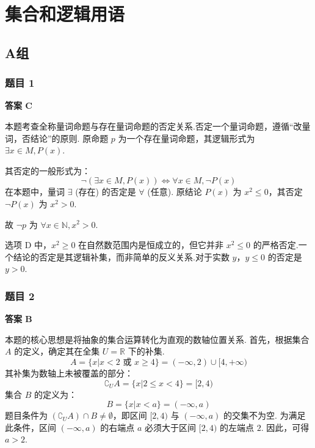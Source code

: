 \section{集合和逻辑用语}

\subsection*{A组}

\subsubsection*{题目 1}
\begin{solution}
	\textbf{答案 C}
	
	本题考查全称量词命题与存在量词命题的否定关系.否定一个量词命题，遵循“改量词，否结论”的原则.
	原命题 $p$ 为一个存在量词命题，其逻辑形式为 $\exists x \in M, P(x)$.
	
	其否定的一般形式为：
	\[ \neg (\exists x \in M, P(x)) \iff \forall x \in M, \neg P(x) \]
	在本题中，量词 $\exists$ (存在) 的否定是 $\forall$ (任意).
	原结论 $P(x)$ 为 $x^2 \le 0$，其否定 $\neg P(x)$ 为 $x^2 > 0$.
	
	故 $\neg p$ 为 $\forall x \in \mathbb{N}, x^2 > 0$.
\end{solution}

\begin{note}
	选项 D 中，$x^2 \ge 0$ 在自然数范围内是恒成立的，但它并非 $x^2 \le 0$ 的严格否定.一个结论的否定是其逻辑补集，而非简单的反义关系.对于实数 $y$，$y \le 0$ 的否定是 $y>0$.
\end{note}

\subsubsection*{题目 2}
\begin{solution}
	\textbf{答案 B}
	
	本题的核心思想是将抽象的集合运算转化为直观的数轴位置关系.
	首先，根据集合 $A$ 的定义，确定其在全集 $U=\mathbb{R}$ 下的补集.
	\[ A = \{x|x<2 \text{ 或 } x \ge 4\} = (-\infty, 2) \cup [4, +\infty) \]
	其补集为数轴上未被覆盖的部分：
	\[ \complement_U A = \{x|2 \le x < 4\} = [2, 4) \]
	集合 $B$ 的定义为：
	\[ B = \{x|x<a\} = (-\infty, a) \]
	题目条件为 $(\complement_U A) \cap B \neq \emptyset$，即区间 $[2, 4)$ 与 $(-\infty, a)$ 的交集不为空.
	为满足此条件，区间 $(-\infty, a)$ 的右端点 $a$ 必须大于区间 $[2,4)$ 的左端点 $2$.
	因此，可得 $a > 2$.
\end{solution}

